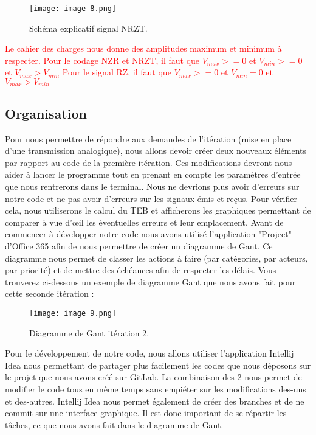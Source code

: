 \begin{figure}[H]
    \centering
    \texttt{[image: image 8.png]}
    \caption{\label{fig:image8}Schéma explicatif signal NRZT.}
\end{figure}

\textcolor{red}{Le cahier des charges nous donne des amplitudes maximum et minimum à respecter. Pour le codage NZR et NRZT, il faut que $V_{max} >= 0$ et $V_{min} >= 0$ et $V_{max} > V_{min} $
Pour le signal RZ, il faut que $V_{max} >= 0$ et $V_{min} = 0$ et $V_{max} > V_{min} $ }

\subsection{Organisation}

Pour nous permettre de répondre aux demandes de l'itération (mise en place d'une transmission analogique), nous allons devoir créer deux nouveaux éléments par rapport au code de la première itération. Ces modifications devront nous aider à lancer le programme tout en prenant en compte les paramètres d'entrée que nous rentrerons dans le terminal.
Nous ne devrions plus avoir d'erreurs sur notre code et ne pas avoir d'erreurs sur les signaux émis et reçus. Pour vérifier cela, nous utiliserons le calcul du TEB et afficherons les graphiques permettant de comparer à vue d'œil les éventuelles erreurs et leur emplacement.
Avant de commencer à développer notre code nous avons utilisé l'application "Project" d'Office 365 afin de nous permettre de créer un diagramme de Gant. Ce diagramme nous permet de classer les actions à faire (par catégories, par acteurs, par priorité) et de mettre des échéances afin de respecter les délais. Vous trouverez ci-dessous un exemple de diagramme Gant que nous avons fait pour cette seconde itération :

\begin{figure}[H]
    \centering
    \texttt{[image: image 9.png]}
    \caption{\label{fig:image9}Diagramme de Gant itération 2.}
\end{figure}

Pour le développement de notre code, nous allons utiliser l'application Intellij Idea nous permettant de partager plus facilement les codes que nous déposons sur le projet que nous avons créé sur GitLab. La combinaison des 2 nous permet de modifier le code tous en même temps sans empiéter sur les modifications des-uns et des-autres. Intellij Idea nous permet également de créer des branches et de ne commit sur une interface graphique. Il est donc important de se répartir les tâches, ce que nous avons fait dans le diagramme de Gant.

